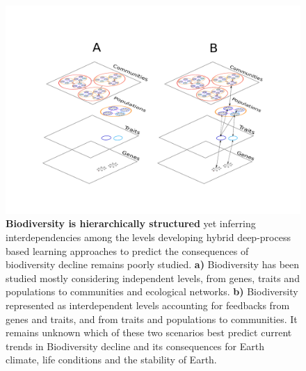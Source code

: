 \documentclass[authoryear,1p,12pt]{elsarticle}
\begin{document}
\begin{figure}
  \begin{center}
        \hspace{-1 in}\includegraphics[width=1\textwidth]{Figure2.pdf}
     \end{center}
     \vspace{-0.15 in}
     \caption{{\bf Biodiversity is hierarchically structured} yet
       inferring interdependencies among the levels developing hybrid
       deep-process based learning approaches to predict the
       consequences of biodiversity decline remains poorly
       studied. {\bf a)} Biodiversity has been studied mostly
       considering independent levels, from genes, traits and
       populations to communities and ecological networks. {\bf b)}
       Biodiversity represented as interdependent levels accounting
       for feedbacks from genes and traits, and from traits and
       populations to communities. It remains unknown which of these
       two scenarios best predict current trends in Biodiversity
       decline and its consequences for Earth climate, life conditions
       and the stability of Earth.}
   \end{figure}
\end{document}
